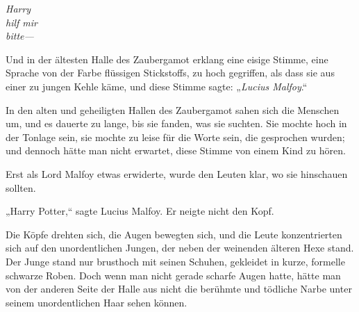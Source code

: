 

\emph{Harry\\
hilf mir\\
bitte—}

Und in der ältesten Halle des Zaubergamot erklang eine eisige Stimme, eine Sprache von der Farbe flüssigen Stickstoffs, zu hoch gegriffen, als dass sie aus einer zu jungen Kehle käme, und diese Stimme sagte: „\emph{Lucius Malfoy}.“

\later

In den alten und geheiligten Hallen des Zaubergamot sahen sich die Menschen um, und es dauerte zu lange, bis sie fanden, was sie suchten. Sie mochte hoch in der Tonlage sein, sie mochte zu leise für die Worte sein, die gesprochen wurden; und dennoch hätte man nicht erwartet, diese Stimme von einem Kind zu hören.

Erst als Lord Malfoy etwas erwiderte, wurde den Leuten klar, wo sie hinschauen sollten.

„Harry Potter,“ sagte Lucius Malfoy. Er neigte nicht den Kopf.

Die Köpfe drehten sich, die Augen bewegten sich, und die Leute konzentrierten sich auf den unordentlichen Jungen, der neben der weinenden älteren Hexe stand. Der Junge stand nur brusthoch mit seinen Schuhen, gekleidet in kurze, formelle schwarze Roben. Doch wenn man nicht gerade scharfe Augen hatte, hätte man von der anderen Seite der Halle aus nicht die berühmte und tödliche Narbe unter seinem unordentlichen Haar sehen können.

